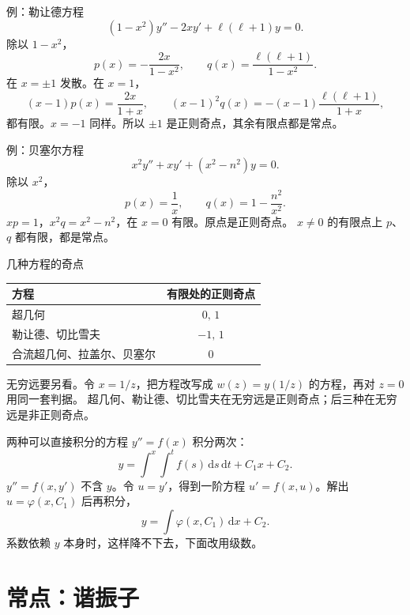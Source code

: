 \documentclass[fontset=windows, chinese, 10pt, xcolor=dvipsnames]{beamer}
\begin{document}
\begin{frame}{例：勒让德方程}
  \[
    (1-x^2)y''-2xy'+\ell(\ell+1)y=0.
  \]
  除以 $1-x^2$，
  \[
    p(x)=-\frac{2x}{1-x^2},\qquad
    q(x)=\frac{\ell(\ell+1)}{1-x^2}.
  \]
  在 $x=\pm 1$ 发散。在 $x=1$，
  \[
    (x-1)p(x)=\frac{2x}{1+x},\qquad
    (x-1)^2 q(x)=-(x-1)\frac{\ell(\ell+1)}{1+x},
  \]
  都有限。$x=-1$ 同样。所以 $\pm 1$ 是正则奇点，其余有限点都是常点。
\end{frame}

\begin{frame}{例：贝塞尔方程}
  \[
    x^2 y''+xy'+(x^2-n^2)y=0.
  \]
  除以 $x^2$，
  \[
    p(x)=\frac{1}{x},\qquad
    q(x)=1-\frac{n^2}{x^2}.
  \]
  $xp=1$，$x^2 q=x^2-n^2$，在 $x=0$ 有限。原点是正则奇点。
  \vspace{0.35em}
  $x\neq 0$ 的有限点上 $p$、$q$ 都有限，都是常点。
\end{frame}

\begin{frame}{几种方程的奇点}
  \begin{center}
  \renewcommand{\arraystretch}{1.25}
  {\small
  \begin{tabular}{lc}
    方程 & 有限处的正则奇点 \\ \hline
    超几何 & $0,\,1$ \\
    勒让德、切比雪夫 & $-1,\,1$ \\
    合流超几何、拉盖尔、贝塞尔 & $0$
  \end{tabular}}
  \end{center}
  \vspace{0.35em}
  无穷远要另看。令 $x=1/z$，把方程改写成 $w(z)=y(1/z)$ 的方程，再对 $z=0$ 用同一套判据。
  超几何、勒让德、切比雪夫在无穷远是正则奇点；后三种在无穷远是非正则奇点。
\end{frame}

\begin{frame}{两种可以直接积分的方程}
  $y''=f(x)$ 积分两次：
  \[
    y=\int^{x}\!\!\int^{t}f(s)\,\mathrm{d}s\,\mathrm{d}t+C_1 x+C_2.
  \]
  $y''=f(x,y')$ 不含 $y$。令 $u=y'$，得到一阶方程 $u'=f(x,u)$。解出 $u=\varphi(x,C_1)$ 后再积分，
  \[
    y=\int\varphi(x,C_1)\,\mathrm{d}x+C_2.
  \]
  系数依赖 $y$ 本身时，这样降不下去，下面改用级数。
\end{frame}

\section{常点：谐振子}
\end{document}
